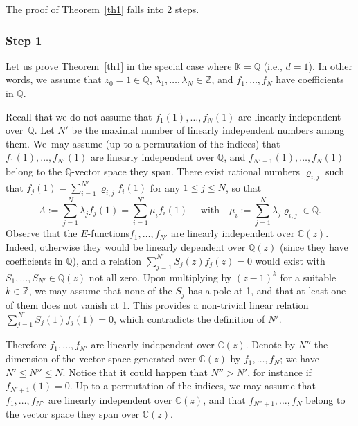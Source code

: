 \documentclass[JEP,XML,SOM,Unicode,published]{cedram}
\newcommand{\Efunctions}{$E$\nobreakdash-func\-tions\xspace}
\theoremstyle{definition}
\newcommand{\Z}{\mathbb{Z}}
\newcommand{\Q}{\mathbb{Q}}
\newcommand{\C}{\mathbb{C}}
\newcommand{\K}{\mathbb{K}}
\begin{document}
The proof of Theorem~\ref{th1} falls into 2 steps.

\subsubsection*{Step 1}
Let us prove Theorem~\ref{th1} in the special case where $\K=\Q$ (i.e., $d=1$). In other words, we assume that $z_0=1\in\Q$, $\lambda_1,\ldots,\lambda_N\in\Z$, and $f_1,\ldots,f_N$ have coefficients in $\Q$.

Recall that we do not assume that $f_1(1),\ldots,f_N(1)$ are linearly independent over~$\Q$. Let $N'$ be the maximal number of linearly independent numbers among them. We~may assume (up to a permutation of the indices) that $f_1(1),\ldots,f_{N'}(1)$ are linearly independent over $\Q$, and $f_{N'+1}(1),\ldots,f_{N}(1)$ belong to the $\Q$-vector space they span. There exist rational numbers $\varrho_{i,j} $ such that
$f_j(1) = \sum_{i=1}^{N'} \varrho_{i,j} f_i(1)$ for any $1\leq j \leq N$, so that
\begin{equation}\label{eqlam2}
\Lambda := \sum_{j=1}^N \lambda_j f_j(1) = \sum_{i=1}^{N'} \mu_i f_i(1) \quad \mbox{ with} \quad
\mu_i := \sum_{j=1}^N \lambda_j \varrho_{i,j}\in\Q.
\end{equation}
Observe that the \Efunctions $f_1,\ldots,f_{N'}$ are linearly independent over $\C(z)$. Indeed, otherwise they would be linearly dependent over $\Q(z)$ (since they have coefficients in $\Q$), and a relation $\sum_{j=1}^{N'} S_j(z) f_j(z)=0$ would exist with $S_1, \ldots, S_{N'}\in \Q(z)$ not all zero. Upon multiplying by $(z-1)^k$ for a suitable $k\in\Z$, we may assume that none of the $S_j$ has a pole at 1, and that at least one of them does not vanish at 1. This provides a non-trivial linear relation $\sum_{j=1}^{N'} S_j(1) f_j(1)=0$, which contradicts the definition of $N'$.

Therefore $f_1,\ldots,f_{N'}$ are linearly independent over $\C(z)$. Denote by $N''$ the dimension of the vector space generated over $\C(z)$ by $f_1,\ldots,f_{N}$; we have $N'\leq N''\leq N$. Notice that it could happen that $N''>N'$, for instance if $f_{N'+1}(1)=0$. Up to a permutation of the indices, we may assume that $f_1,\ldots,f_{N''}$ are linearly independent over $\C(z)$, and that
$f_{N''+1},\ldots,f_{N}$ belong to the vector space they span over $\C(z)$.
\end{document}
